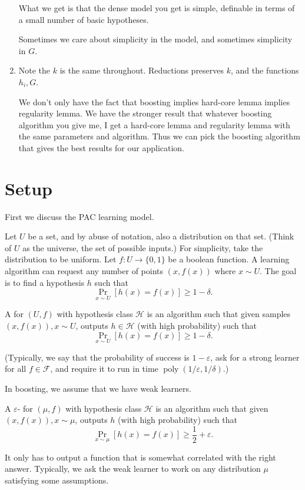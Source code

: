 \begin{enumerate}
What we get is that the dense model you get is simple, definable in terms of a small number of basic hypotheses. 

Sometimes we care about simplicity in the model, and sometimes simplicity in $G$.
\item
Note the $k$ is the same throughout. Reductions preserves $k$, and the functions $h_i, G$. 

We don't only have the fact that boosting implies hard-core lemma implies regularity lemma. We have the stronger result that whatever boosting algorithm you give me, I get a hard-core lemma and regularity lemma with the same parameters and algorithm. %
Thus we can pick the boosting algorithm that gives the best results for our application.
\end{enumerate}
\section{Setup}
First we discuss the PAC learning model.

Let $U$ be a set, and by abuse of notation, also a distribution on that set. (Think of $U$ as the universe, the set of possible inputs.) For simplicity, take the distribution to be uniform.
Let $f:U\to \{0,1\}$ be a boolean function.
A learning algorithm can request any number of points $(x,f(x))$ where $x\sim U$. The goal is to find a hypothesis $h$ such that 
$$
\Pr_{x\sim U} [h(x)=f(x)]\ge 1-\delta.
$$
\begin{thm}
A  for $(U,f)$ with hypothesis class $\mathcal H$ is an algorithm such that given samples $(x,f(x)), x\sim U$, outputs $h\in \mathcal H$ (with high probability) such that 
$$\Pr_{x\sim U}[h(x)=f(x)]\ge 1-\delta.$$

(Typically, we say that the probability of success is $1-\varepsilon$, ask for a strong learner for all $f\in \mathcal F$, and require it to run in time $\operatorname{poly}(1/\varepsilon, 1/\delta)$.) 
\end{thm}

In boosting, we assume that we have weak learners.
\begin{thm}
A $\varepsilon$- for $(\mu, f)$ with hypothesis class $\mathcal H$ is an algorithm such that given $(x,f(x)), x\sim \mu$, outputs $h$ (with high probability) such that
$$
\Pr_{x\sim \mu} [h(x)=f(x)] \ge \frac{1}{2}+\varepsilon.
$$
\end{thm}
It only has to output a function that is somewhat correlated with the right answer.
Typically, we ask the weak learner to work on any distribution $\mu$ satisfying some assumptions.

